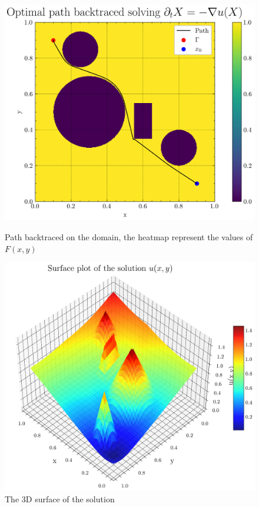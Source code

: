 \documentclass[11pt]{article}
\theoremstyle{definition}
\theoremstyle{remark}
\begin{document}
\begin{figure}[h]
  \centering
  \begin{minipage}{0.45\textwidth}
    \centering
    \includegraphics[width=\textwidth]{plots/path_mountain.png}
    \caption{Path backtraced on the domain, the heatmap represent the values of $F(x,y)$}
  \end{minipage}
  \hfill
  \begin{minipage}{0.45\textwidth}
    \centering
    \includegraphics[width=\textwidth]{plots/surface_mountain.png}
    \caption{The 3D surface of the solution}
  \end{minipage}
\end{figure}
\end{document}
